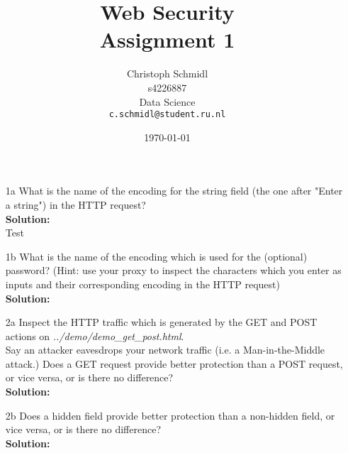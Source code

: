 \documentclass[a4paper]{article}
\title{Web Security\\Assignment 1}
\author{
  Christoph Schmidl\\ s4226887\\ Data Science\\      \texttt{c.schmidl@student.ru.nl}
}
\date{\today}
\begin{document}
\maketitle

\begin{enumerate}
	\item[1a] What is the name of the encoding for the string field (the one after "Enter a string") in the HTTP request?\\
	\textbf{Solution:}\\
	
	Test	
	
	\item[1b] What is the name of the encoding which is used for the (optional) password? (Hint: use your proxy to inspect the characters which you enter as inputs and their corresponding encoding in the HTTP request)\\
	\textbf{Solution:}\\
	
	
	\item[2a] Inspect the HTTP traffic which is generated by the GET and POST actions on \textit{../demo/demo\_get\_post.html}.\\
	Say an attacker eavesdrops your network traffic (i.e. a Man-in-the-Middle attack.) Does a GET request provide better protection than a POST request, or vice versa, or is there no difference?\\
	\textbf{Solution:}\\
	
	
	\item[2b] Does a hidden field provide better protection than a non-hidden field, or vice versa, or is there no difference?\\
	\textbf{Solution:}\\
		
	
\end{enumerate}
\end{document}
